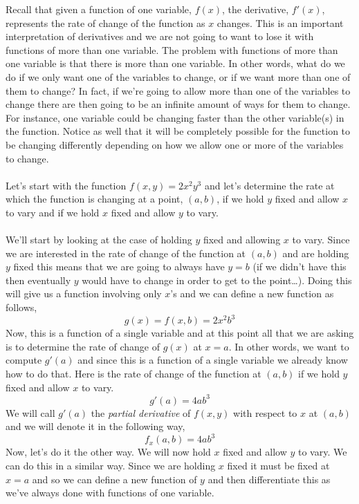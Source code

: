 \documentclass[10pt,reqno]{book}
\theoremstyle{definition}
\begin{document}
	Recall that given a function of one variable, $ f(x) $, the derivative, $ f'(x) $, represents the rate of change of the function as $ x $ changes. This is an important interpretation of derivatives and we are not going to want to lose it with functions of more than one variable. The problem with functions of more than one variable is that there is more than one variable. In other words, what do we do if we only want one of the variables to change, or if we want more than one of them to change? In fact, if we're going to allow more than one of the variables to change there are then going to be an infinite amount of ways for them to change. For instance, one variable could be changing faster than the other variable(s) in the function. Notice as well that it will be completely possible for the function to be changing differently depending on how we allow one or more of the variables to change. \\ \\
	Let's start with the function $ f(x,y) = 2x^2 y^3 $ and let's determine the rate at which the function is changing at a point, $ (a,b) $, if we hold $ y $ fixed and allow $ x $ to vary and if we hold $ x $ fixed and allow $ y $ to vary.\\ \\ 
	We'll start by looking at the case of holding $ y $ fixed and allowing $ x $ to vary.  Since we are interested in the rate of change of the function at $ (a,b) $ and are holding $ y $ fixed this means that we are going to always have $ y = b $ (if we didn't have this then eventually $ y $ would have to change in order to get to the point…). Doing this will give us a function involving only $ x $’s and we can define a new function as follows,
	\[ g(x) = f(x,b) = 2x^2b^3 \]
	Now, this is a function of a single variable and at this point all that we are asking is to determine the rate of change of $ g(x) $ at $ x = a $. In other words, we want to compute $ g'(a) $ and since this is a function of a single variable we already know how to do that. Here is the rate of change of the function at $ (a,b) $ if we hold $ y $ fixed and allow $ x $ to vary.
	\[ g'(a) = 4ab^3 \]
	We will call $ g'(a) $ the \textit{partial derivative} of $ f(x,y) $ with respect to $ x $ at $ (a,b) $ and we will denote it in the following way,
	\[ f_x(a,b) = 4ab^3 \]
	Now, let's do it the other way. We will now hold $ x $ fixed and allow $ y $ to vary. We can do this in a similar way. Since we are holding $ x $ fixed it must be fixed at $ x = a $ and so we can define a new function of $ y $ and then differentiate this as we've always done with functions of one variable.
\end{document}
